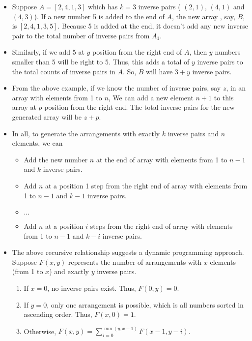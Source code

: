 \begin{itemize}
\item Suppose $A=​ [2,4,1,3]$ which has $k=3$ inverse pairs ( $(2,1)$, $(4,1)$ and $(4,3)$). If a new number 5 is added to the end of $A$, the new array , say, $B$, is $[2,4,1,3,5]$. Because 5 is added at the end, it doesn't add any new inverse pair to the total number of inverse pairs from $A_1$.
\item Similarly, if we add 5 at $y$ position from the right end of $A$, then $y$ numbers smaller than 5 will be right to 5. Thus, this adds a total of $y$ inverse pairs to the total counts of inverse pairs in $A$. So, $B$ will have $3+y$ inverse pairs.

\item From the above example, if we know the number of inverse pairs, say $z$, in an array with elements from 1 to $n$, We can add a new element $n+1$ to this array at $p$ position from the right end. The total inverse pairs for the new generated array will be $z+p$.

\item In all, to generate the arrangements with exactly $k$ inverse pairs and $n$ elements, we can 

\begin{itemize}
\item Add the new number $n$ at the end of array with elements from 1 to $n-1$ and $k$ inverse pairs. 
\item Add $n$ at a position 1 step from the right end of array with elements from 1 to $n-1$ and $k-1$ inverse pairs.
\item $\ldots$
\item Add $n$ at a position $i$ steps from the right end of array with elements from 1 to $n-1$ and $k-i$ inverse pairs.
\end{itemize}
\item The above recursive relationship suggests a dynamic programming approach. Suppose $F(x,y)$ represents the number of arrangements with $x$ elements (from 1 to $x$) and exactly $y$ inverse pairs.

\begin{enumerate}
\item If $x=0$, no inverse pairs exist. Thus, $F(0, y)=0$.

\item If $y=0$, only one arrangement is possible, which is all numbers sorted in ascending order. Thus, $F(x,0)=1$.

\item Otherwise, $F(x,y)=\sum\limits_{i=0}^{\min(y, x-1)}F(x−1,y−i)$.
\end{enumerate}


\end{itemize}
